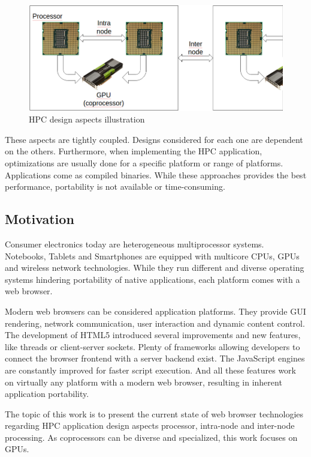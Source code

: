 \begin{figure}[htp]
  \begin{center}
    \includegraphics[width=0.9\columnwidth]{resources/hpc_aspects.png}
  \end{center}
  \caption{HPC design aspects illustration}
  \label{fig:hpcaspects}
\end{figure}

These aspects are tightly coupled. Designs considered for each one are dependent on the others. Furthermore, when implementing the HPC application, optimizations are usually done for a specific platform or range of platforms. Applications come as compiled binaries. While these approaches provides the best performance, portability is not available or time-consuming.


\subsection{Motivation}

Consumer electronics today are heterogeneous multiprocessor systems. Notebooks, Tablets and Smartphones are equipped with multicore CPUs, GPUs and wireless network technologies. While they run different and diverse operating systems hindering portability of native applications, each platform comes with a web browser.

Modern web browsers can be considered application platforms. They provide GUI rendering, network communication, user interaction and dynamic content control. The development of HTML5 introduced several improvements and new features, like threads or client-server sockets. Plenty of frameworks allowing developers to connect the browser frontend with a server backend exist. The JavaScript engines are constantly improved for faster script execution. And all these features work on virtually any platform with a modern web browser, resulting in inherent application portability.

The topic of this work is to present the current state of web browser technologies regarding HPC application design aspects processor, intra-node and inter-node processing. As coprocessors can be diverse and specialized, this work focuses on GPUs.


